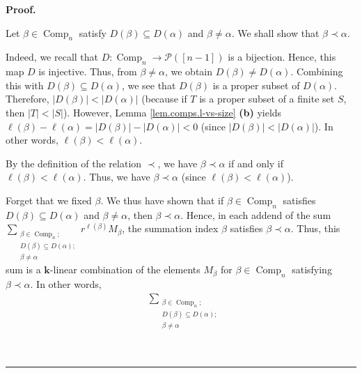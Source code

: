 \documentclass[numbers=enddot,12pt,final,onecolumn,notitlepage]{scrartcl}%
\theoremstyle{definition}
\newenvironment{proof}[1][Proof]{\noindent\textbf{#1.} }{\ \rule{0.5em}{0.5em}}
\let\sumnonlimits\sum
\renewcommand{\sum}{\sumnonlimits\limits}
\newenvironment{verlong}{}{}
\begin{document}
\begin{verlong}
\begin{proof}
{Let $\beta\in\operatorname*{Comp}\nolimits_{n}$ satisfy $D\left(
\beta\right)  \subseteq D\left(  \alpha\right)  $ and $\beta\neq\alpha$. We
shall show that $\beta\prec\alpha$.
\par
Indeed, we recall that $D:\operatorname*{Comp}\nolimits_{n}\rightarrow
\mathcal{P}\left(  \left[  n-1\right]  \right)  $ is a bijection. Hence, this
map $D$ is injective. Thus, from $\beta\neq\alpha$, we obtain $D\left(
\beta\right)  \neq D\left(  \alpha\right)  $. Combining this with $D\left(
\beta\right)  \subseteq D\left(  \alpha\right)  $, we see that $D\left(
\beta\right)  $ is a proper subset of $D\left(  \alpha\right)  $. Therefore,
$\left\vert D\left(  \beta\right)  \right\vert <\left\vert D\left(
\alpha\right)  \right\vert $ (because if $T$ is a proper subset of a finite
set $S$, then $\left\vert T\right\vert <\left\vert S\right\vert $). However,
Lemma \ref{lem.comps.l-vs-size} \textbf{(b)} yields $\ell\left(  \beta\right)
-\ell\left(  \alpha\right)  =\left\vert D\left(  \beta\right)  \right\vert
-\left\vert D\left(  \alpha\right)  \right\vert <0$ (since $\left\vert
D\left(  \beta\right)  \right\vert <\left\vert D\left(  \alpha\right)
\right\vert $). In other words, $\ell\left(  \beta\right)  <\ell\left(
\alpha\right)  $.
\par
By the definition of the relation $\prec$, we have $\beta\prec\alpha$ if and
only if $\ell\left(  \beta\right)  <\ell\left(  \alpha\right)  $. Thus, we
have $\beta\prec\alpha$ (since $\ell\left(  \beta\right)  <\ell\left(
\alpha\right)  $).
\par
Forget that we fixed $\beta$. We thus have shown that if $\beta\in
\operatorname*{Comp}\nolimits_{n}$ satisfies $D\left(  \beta\right)  \subseteq
D\left(  \alpha\right)  $ and $\beta\neq\alpha$, then $\beta\prec\alpha$.
Hence, in each addend of the sum $\sum_{\substack{\beta\in\operatorname*{Comp}%
\nolimits_{n};\\D\left(  \beta\right)  \subseteq D\left(  \alpha\right)
;\\\beta\neq\alpha}}r^{\ell\left(  \beta\right)  }M_{\beta}$, the summation
index $\beta$ satisfies $\beta\prec\alpha$. Thus, this sum is a $\mathbf{k}%
$-linear combination of the elements $M_{\beta}$ for $\beta\in
\operatorname*{Comp}\nolimits_{n}$ satisfying $\beta\prec\alpha$. In other
words,%
\begin{align*}
&  \sum_{\substack{\beta\in\operatorname*{Comp}\nolimits_{n};\\D\left(
\beta\right)  \subseteq D\left(  \alpha\right)  ;\\\beta\neq\alpha}%
}
\end{align*}}
\end{proof}
\end{verlong}
\end{document}
